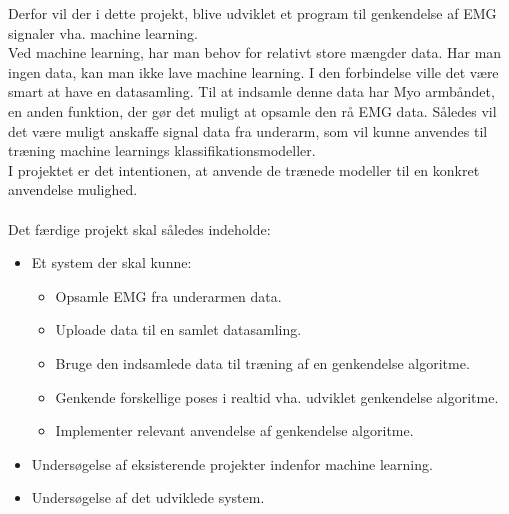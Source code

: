 Derfor vil der i dette projekt, blive udviklet et program til genkendelse af EMG signaler vha. machine learning. \\
Ved machine learning, har man behov for relativt store mængder data. Har man ingen data, kan man ikke lave machine learning. I den forbindelse ville det være smart at have en datasamling. Til at indsamle denne data har Myo armbåndet, en anden funktion, der gør det muligt at opsamle den rå EMG data. Således vil det være muligt anskaffe signal data fra underarm, som vil kunne anvendes til træning machine learnings klassifikationsmodeller. \\
I projektet er det intentionen, at anvende de trænede modeller til en konkret anvendelse mulighed. \\\\
Det færdige projekt skal således indeholde:
\begin{itemize}
\item Et system der skal kunne:
	\begin{itemize}
		\item Opsamle EMG fra underarmen data.
		\item Uploade data til en samlet datasamling.
		\item Bruge den indsamlede data til træning af en genkendelse algoritme.
		\item Genkende forskellige poses i realtid vha. udviklet genkendelse algoritme.
		\item Implementer relevant anvendelse af genkendelse algoritme.
	\end{itemize}
\item Undersøgelse af eksisterende projekter indenfor machine learning.
\item Undersøgelse af det udviklede system.
\end{itemize}
